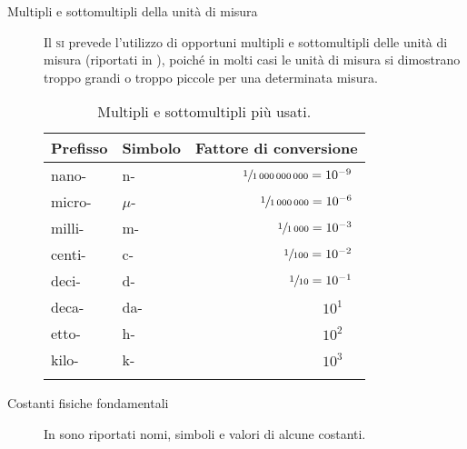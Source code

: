 \documentclass[a4paper,11pt,italian]{article}
\begin{document}
\begin{description}
  \item[Multipli e sottomultipli della unità di misura] %
  Il \textsc{si} prevede l'utilizzo di opportuni multipli e sottomultipli delle unità di misura (riportati in ), poiché in molti casi le unità di misura si dimostrano troppo grandi o troppo piccole per una determinata misura.
  \begin{table}[htp]\centering
    \begin{tabular}{llr}\toprule
      \textbf{Prefisso} & \textbf{Simbolo} & \textbf{Fattore di conversione} \\\midrule
      nano- & n- & $ \sfrac{1}{1\,000\,000\,000} = 10^{-9} \:\, $\\\addlinespace[.2em]
      micro- & $ \mu $- & $ \sfrac{1}{1\,000\,000} = 10^{-6} \:\, $\\\addlinespace[.2em]
      milli- & m- & $ \sfrac{1}{1\,000} = 10^{-3} \:\, $\\\addlinespace[.2em]
      centi- & c- & $ \sfrac{1}{100} = 10^{-2} \:\, $\\\addlinespace[.2em]
      deci- & d- & $ \sfrac{1}{10} = 10^{-1} \:\, $\\\addlinespace[.2em]
      deca- & da- & $ 10^{1} \;\;\;\, $\\\addlinespace[.2em]
      etto- & h- & $ 10^{2} \;\;\;\, $\\\addlinespace[.2em]
      kilo- & k- & $ 10^{3} \;\;\;\, $\\\addlinespace[.2em]
      \bottomrule
    \end{tabular}
  \caption{Multipli e sottomultipli più usati.}
    \label{tab:multipliesottomultipli}
  \end{table}
  
  \item[Costanti fisiche fondamentali] In  sono riportati nomi, simboli e valori di alcune costanti.
  

\end{description}
\end{document}
